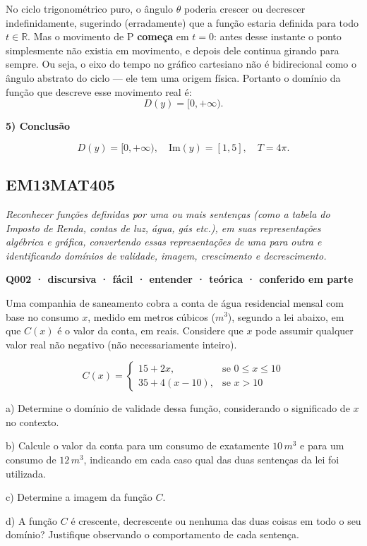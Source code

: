 \documentclass[11pt,a4paper]{article}
\begin{document}
No ciclo trigonométrico puro, o ângulo $\theta$ poderia crescer ou decrescer indefinidamente, sugerindo (erradamente) que a função estaria definida para todo $t \in \mathbb{R}$. Mas o movimento de P \textbf{começa} em $t=0$: antes desse instante o ponto simplesmente não existia em movimento, e depois dele continua girando para sempre. Ou seja, o eixo do tempo no gráfico cartesiano não é bidirecional como o ângulo abstrato do ciclo — ele tem uma origem física. Portanto o domínio da função que descreve esse movimento real é:
$$D(y) = [0, +\infty).$$

\textbf{5) Conclusão}

$$D(y) = [0,+\infty), \quad \text{Im}(y) = [1,5], \quad T = 4\pi.$$
\subsection*{EM13MAT405}
{\small\itshape Reconhecer funções definidas por uma ou mais sentenças (como a tabela do Imposto de Renda, contas de luz, água, gás etc.), em suas representações algébrica e gráfica, convertendo essas representações de uma para outra e identificando domínios de validade, imagem, crescimento e decrescimento.}

\bigskip\noindent\textbf{Q002 · discursiva · fácil · entender · teórica · conferido em parte}\par\nopagebreak
Uma companhia de saneamento cobra a conta de água residencial mensal com base no consumo $x$, medido em metros cúbicos ($m^3$), segundo a lei abaixo, em que $C(x)$ é o valor da conta, em reais. Considere que $x$ pode assumir qualquer valor real não negativo (não necessariamente inteiro).

$$C(x) = \begin{cases} 15 + 2x, & \text{se } 0 \le x \le 10 \\ 35 + 4(x-10), & \text{se } x > 10 \end{cases}$$

a) Determine o domínio de validade dessa função, considerando o significado de $x$ no contexto.

b) Calcule o valor da conta para um consumo de exatamente $10\,m^3$ e para um consumo de $12\,m^3$, indicando em cada caso qual das duas sentenças da lei foi utilizada.

c) Determine a imagem da função $C$.

d) A função $C$ é crescente, decrescente ou nenhuma das duas coisas em todo o seu domínio? Justifique observando o comportamento de cada sentença.
\end{document}
